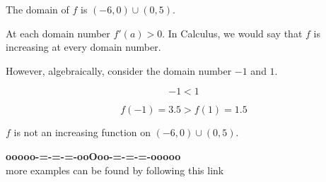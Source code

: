 \documentclass{ximera}
\begin{document}
\begin{warning}
\begin{image}
\end{image}


The domain of $f$ is $(-6, 0) \cup (0, 5)$.

At each domain number $f'(a) > 0$. In Calculus, we would say that $f$ is increasing at every domain number.


However, algebraically, consider the domain number $-1$ and $1$.


\[ -1 < 1 \]


\[ f(-1) = 3.5   >  f(1) = 1.5  \]


$f$ is not an increasing function on $(-6, 0) \cup (0, 5)$.


\end{warning}








\begin{onlineOnly}
\begin{center}
\textbf{\textcolor{green!50!black}{ooooo-=-=-=-ooOoo-=-=-=-ooooo}} \\

more examples can be found by following this link\\ 

\end{center}
\end{onlineOnly}
\end{document}
